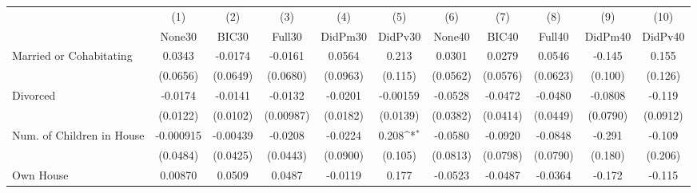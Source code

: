 {
\def\sym#1{\ifmmode^{#1}\else\(^{#1}\)\fi}
\begin{tabular}{l*{10}{c}}
\toprule
            &\multicolumn{1}{c}{(1)}&\multicolumn{1}{c}{(2)}&\multicolumn{1}{c}{(3)}&\multicolumn{1}{c}{(4)}&\multicolumn{1}{c}{(5)}&\multicolumn{1}{c}{(6)}&\multicolumn{1}{c}{(7)}&\multicolumn{1}{c}{(8)}&\multicolumn{1}{c}{(9)}&\multicolumn{1}{c}{(10)}\\
            &\multicolumn{1}{c}{None30}&\multicolumn{1}{c}{BIC30}&\multicolumn{1}{c}{Full30}&\multicolumn{1}{c}{DidPm30}&\multicolumn{1}{c}{DidPv30}&\multicolumn{1}{c}{None40}&\multicolumn{1}{c}{BIC40}&\multicolumn{1}{c}{Full40}&\multicolumn{1}{c}{DidPm40}&\multicolumn{1}{c}{DidPv40}\\
\midrule
Married or Cohabitating&      0.0343         &     -0.0174         &     -0.0161         &      0.0564         &       0.213         &      0.0301         &      0.0279         &      0.0546         &      -0.145         &       0.155         \\
            &    (0.0656)         &    (0.0649)         &    (0.0680)         &    (0.0963)         &     (0.115)         &    (0.0562)         &    (0.0576)         &    (0.0623)         &     (0.100)         &     (0.126)         \\
\addlinespace
Divorced    &     -0.0174         &     -0.0141         &     -0.0132         &     -0.0201         &    -0.00159         &     -0.0528         &     -0.0472         &     -0.0480         &     -0.0808         &      -0.119         \\
            &    (0.0122)         &    (0.0102)         &   (0.00987)         &    (0.0182)         &    (0.0139)         &    (0.0382)         &    (0.0414)         &    (0.0449)         &    (0.0790)         &    (0.0912)         \\
\addlinespace
Num. of Children in House&   -0.000915         &    -0.00439         &     -0.0208         &     -0.0224         &       0.208\sym{*}  &     -0.0580         &     -0.0920         &     -0.0848         &      -0.291         &      -0.109         \\
            &    (0.0484)         &    (0.0425)         &    (0.0443)         &    (0.0900)         &     (0.105)         &    (0.0813)         &    (0.0798)         &    (0.0790)         &     (0.180)         &     (0.206)         \\
\addlinespace
Own House   &     0.00870         &      0.0509         &      0.0487         &     -0.0119         &       0.177         &     -0.0523         &     -0.0487         &     -0.0364         &      -0.172         &      -0.115         \\

\end{tabular}}
